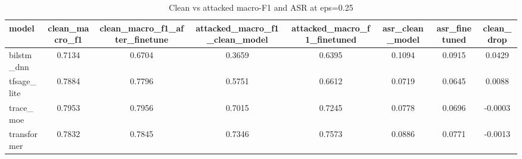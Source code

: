 \begin{table}[htbp]
\centering
\caption{Clean vs attacked macro-F1 and ASR at eps=0.25}
\label{tab:robustness_asr}
\begin{tabular}{lccccccc}
\toprule
model & clean\_macro\_f1 & clean\_macro\_f1\_after\_finetune & attacked\_macro\_f1\_clean\_model & attacked\_macro\_f1\_finetuned & asr\_clean\_model & asr\_finetuned & clean\_drop \\
\midrule
bilstm\_dnn & 0.7134 & 0.6704 & 0.3659 & 0.6395 & 0.1094 & 0.0915 & 0.0429 \\
tfsage\_lite & 0.7884 & 0.7796 & 0.5751 & 0.6612 & 0.0719 & 0.0645 & 0.0088 \\
trace\_moe & 0.7953 & 0.7956 & 0.7015 & 0.7245 & 0.0778 & 0.0696 & -0.0003 \\
transformer & 0.7832 & 0.7845 & 0.7346 & 0.7573 & 0.0886 & 0.0771 & -0.0013 \\
\bottomrule
\end{tabular}
\end{table}